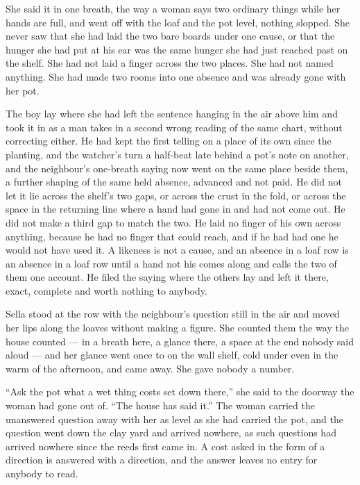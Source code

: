 She said it in one breath, the way a woman says two ordinary things while her hands are full, and went off with the loaf and the pot level, nothing slopped. She never saw that she had laid the two bare boards under one cause, or that the hunger she had put at his ear was the same hunger she had just reached past on the shelf. She had not laid a finger across the two places. She had not named anything. She had made two rooms into one absence and was already gone with her pot.

The boy lay where she had left the sentence hanging in the air above him and took it in as a man takes in a second wrong reading of the same chart, without correcting either. He had kept the first telling on a place of its own since the planting, and the watcher's turn a half-beat late behind a pot's note on another, and the neighbour's one-breath saying now went on the same place beside them, a further shaping of the same held absence, advanced and not paid. He did not let it lie across the shelf's two gaps, or across the crust in the fold, or across the space in the returning line where a hand had gone in and had not come out. He did not make a third gap to match the two. He laid no finger of his own across anything, because he had no finger that could reach, and if he had had one he would not have used it. A likeness is not a cause, and an absence in a loaf row is an absence in a loaf row until a hand not his comes along and calls the two of them one account. He filed the saying where the others lay and left it there, exact, complete and worth nothing to anybody.

Sella stood at the row with the neighbour's question still in the air and moved her lips along the loaves without making a figure. She counted them the way the house counted --- in a breath here, a glance there, a space at the end nobody said aloud --- and her glance went once to  on the wall shelf, cold under  even in the warm of the afternoon, and came away. She gave nobody a number.

“Ask the pot what a wet thing costs set down there,” she said to the doorway the woman had gone out of. “The house has said it.” The woman carried the unanswered question away with her as level as she had carried the pot, and the question went down the clay yard and arrived nowhere, as such questions had arrived nowhere since the reeds first came in. A cost asked in the form of a direction is answered with a direction, and the answer leaves no entry for anybody to read.

